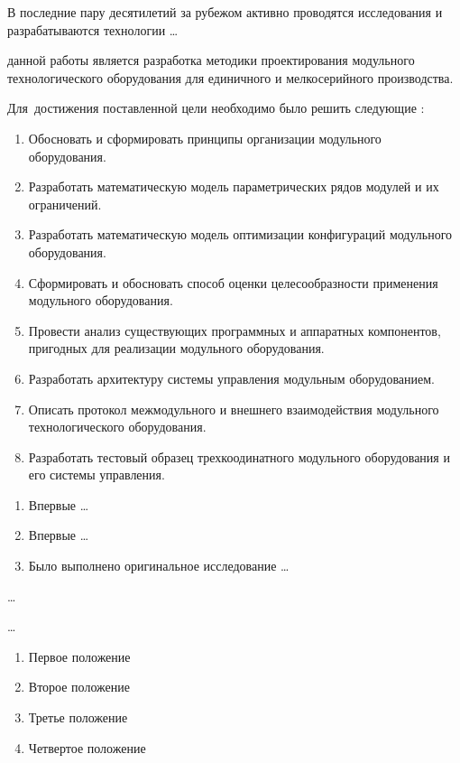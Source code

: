 {\progress} В последние пару десятилетий за рубежом активно проводятся исследования и разрабатываются технологии \ldots

{\aim} данной работы является разработка методики проектирования модульного технологического оборудования для единичного и мелкосерийного производства.

Для~достижения поставленной цели необходимо было решить следующие {\tasks}:
\begin{enumerate}[beginpenalty=10000] %
  \item Обосновать и сформировать принципы организации модульного оборудования.
  \item Разработать математическую модель параметрических рядов модулей и их ограничений.
  \item Разработать математическую модель оптимизации конфигураций модульного оборудования.
  \item Сформировать и обосновать способ оценки целесообразности применения модульного оборудования.
  \item Провести анализ существующих программных и аппаратных компонентов, пригодных для реализации модульного оборудования.
  \item Разработать архитектуру системы управления модульным оборудованием.
  \item Описать протокол межмодульного и внешнего взаимодействия модульного технологического оборудования.
  \item Разработать тестовый образец трехкоодинатного модульного оборудования и его системы управления.
\end{enumerate}


{\novelty}
\begin{enumerate}[beginpenalty=10000] %
  \item Впервые \ldots
  \item Впервые \ldots
  \item Было выполнено оригинальное исследование \ldots
\end{enumerate}

{\influence} \ldots

{\methods} \ldots

{}
\begin{enumerate}[beginpenalty=10000] %
  \item Первое положение
  \item Второе положение
  \item Третье положение
  \item Четвертое положение
\end{enumerate}

